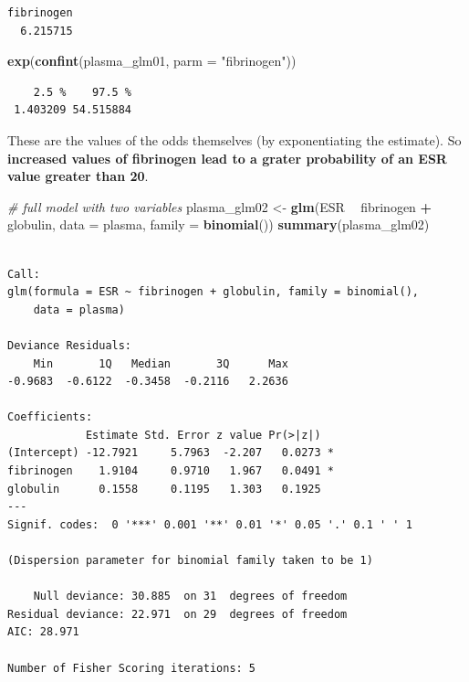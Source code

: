 \documentclass[
]{article}
\newenvironment{Shaded}{\begin{snugshade}}{\end{snugshade}}
\newcommand{\CommentTok}[1]{\textcolor[rgb]{0.56,0.35,0.01}{\textit{#1}}}
\newcommand{\DataTypeTok}[1]{\textcolor[rgb]{0.13,0.29,0.53}{#1}}
\newcommand{\KeywordTok}[1]{\textcolor[rgb]{0.13,0.29,0.53}{\textbf{#1}}}
\newcommand{\NormalTok}[1]{#1}
\newcommand{\OperatorTok}[1]{\textcolor[rgb]{0.81,0.36,0.00}{\textbf{#1}}}
\newcommand{\StringTok}[1]{\textcolor[rgb]{0.31,0.60,0.02}{#1}}
\begin{document}
\begin{verbatim}
fibrinogen 
  6.215715 
\end{verbatim}

\begin{Shaded}
\begin{Highlighting}[]
\KeywordTok{exp}\NormalTok{(}\KeywordTok{confint}\NormalTok{(plasma_glm01, }\DataTypeTok{parm =} \StringTok{"fibrinogen"}\NormalTok{))}
\end{Highlighting}
\end{Shaded}

\begin{verbatim}
    2.5 %    97.5 % 
 1.403209 54.515884 
\end{verbatim}

These are the values of the odds themselves (by exponentiating the
estimate). So \textbf{increased values of fibrinogen lead to a grater
probability of an ESR value greater than 20}.

\begin{Shaded}
\begin{Highlighting}[]
\CommentTok{# full model with two variables}
\NormalTok{plasma_glm02 <-}\StringTok{ }\KeywordTok{glm}\NormalTok{(ESR }\OperatorTok{~}\StringTok{ }\NormalTok{fibrinogen }\OperatorTok{+}\StringTok{ }\NormalTok{globulin, }\DataTypeTok{data =}\NormalTok{ plasma, }\DataTypeTok{family =} \KeywordTok{binomial}\NormalTok{())}
\KeywordTok{summary}\NormalTok{(plasma_glm02)}
\end{Highlighting}
\end{Shaded}

\begin{verbatim}

Call:
glm(formula = ESR ~ fibrinogen + globulin, family = binomial(), 
    data = plasma)

Deviance Residuals: 
    Min       1Q   Median       3Q      Max  
-0.9683  -0.6122  -0.3458  -0.2116   2.2636  

Coefficients:
            Estimate Std. Error z value Pr(>|z|)  
(Intercept) -12.7921     5.7963  -2.207   0.0273 *
fibrinogen    1.9104     0.9710   1.967   0.0491 *
globulin      0.1558     0.1195   1.303   0.1925  
---
Signif. codes:  0 '***' 0.001 '**' 0.01 '*' 0.05 '.' 0.1 ' ' 1

(Dispersion parameter for binomial family taken to be 1)

    Null deviance: 30.885  on 31  degrees of freedom
Residual deviance: 22.971  on 29  degrees of freedom
AIC: 28.971

Number of Fisher Scoring iterations: 5
\end{verbatim}
\end{document}
